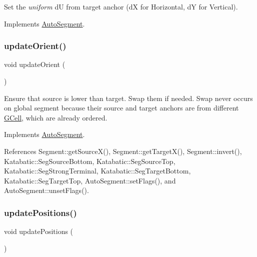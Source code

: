 Set the {\itshape uniform} {\ttfamily dU} from target anchor (dX for Horizontal, dY for Vertical). 

Implements \hyperlink{classKatabatic_1_1AutoSegment_a246756d4c8b3e094a0a9d6de3c2109ff}{Auto\+Segment}.

\mbox{\label{classKatabatic_1_1AutoHorizontal_a59058f4593049c583c5b3698ff81b299}} 
\subsubsection{\texorpdfstring{update\+Orient()}{updateOrient()}}
{\footnotesize\ttfamily void update\+Orient (\begin{DoxyParamCaption}{ }\end{DoxyParamCaption})\hspace{0.3cm}{\ttfamily [virtual]}}

Ensure that source is lower than target. Swap them if needed. Swap never occurs on global segment because their source and target anchors are from different \hyperlink{classKatabatic_1_1GCell}{G\+Cell}, which are already ordered. 

Implements \hyperlink{classKatabatic_1_1AutoSegment_a102e0f4bbb0386e41be214d15a9e4549}{Auto\+Segment}.



References Segment\+::get\+Source\+X(), Segment\+::get\+Target\+X(), Segment\+::invert(), Katabatic\+::\+Seg\+Source\+Bottom, Katabatic\+::\+Seg\+Source\+Top, Katabatic\+::\+Seg\+Strong\+Terminal, Katabatic\+::\+Seg\+Target\+Bottom, Katabatic\+::\+Seg\+Target\+Top, Auto\+Segment\+::set\+Flags(), and Auto\+Segment\+::unset\+Flags().

\mbox{\label{classKatabatic_1_1AutoHorizontal_a9662a77c2ed8553d6a0312c5292060ad}} 
\subsubsection{\texorpdfstring{update\+Positions()}{updatePositions()}}
{\footnotesize\ttfamily void update\+Positions (\begin{DoxyParamCaption}{ }\end{DoxyParamCaption})\hspace{0.3cm}{\ttfamily [virtual]}}

